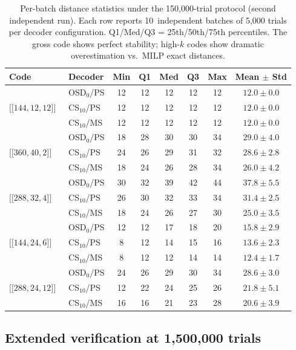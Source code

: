\documentclass[aps,prxquantum,twocolumn,superscriptaddress,nofootinbib]{revtex4-2}
\newcommand{\dblbrk}[1]{\ensuremath{\lbrack\!\lbrack #1 \rbrack\!\rbrack}}
\newcommand{\code}[1]{\dblbrk{#1}}
\begin{document}
\begin{table}[t]
\centering
\caption{Per-batch distance statistics under the 150{,}000-trial protocol (second independent run).
Each row reports 10~independent batches of 5{,}000 trials per decoder configuration.
Q1/Med/Q3 = 25th/50th/75th percentiles.
The gross code shows perfect stability; high-$k$ codes show dramatic overestimation vs.\ MILP exact distances.}
\label{tab:per_batch_stats}
\small
\begin{tabular}{llcccccc}
\toprule
Code & Decoder & Min & Q1 & Med & Q3 & Max & Mean $\pm$ Std \\
\midrule
\multirow{3}{*}{$\code{144,12,12}$~\cite{bravyi2024high}}
  & OSD$_0$/PS    & 12 & 12 & 12 & 12 & 12 & $12.0 \pm 0.0$ \\
  & CS$_{10}$/PS  & 12 & 12 & 12 & 12 & 12 & $12.0 \pm 0.0$ \\
  & CS$_{10}$/MS  & 12 & 12 & 12 & 12 & 12 & $12.0 \pm 0.0$ \\
\midrule
\multirow{3}{*}{$\code{360,40,2}$}
  & OSD$_0$/PS    & 18 & 28 & 30 & 30 & 34 & $29.0 \pm 4.0$ \\
  & CS$_{10}$/PS  & 24 & 26 & 29 & 31 & 32 & $28.6 \pm 2.8$ \\
  & CS$_{10}$/MS  & 18 & 24 & 26 & 28 & 34 & $26.0 \pm 4.2$ \\
\midrule
\multirow{3}{*}{$\code{288,32,4}$}
  & OSD$_0$/PS    & 30 & 32 & 39 & 42 & 44 & $37.8 \pm 5.5$ \\
  & CS$_{10}$/PS  & 26 & 30 & 32 & 33 & 34 & $31.4 \pm 2.5$ \\
  & CS$_{10}$/MS  & 18 & 24 & 26 & 27 & 30 & $25.0 \pm 3.5$ \\
\midrule
\multirow{3}{*}{$\code{144,24,6}$}
  & OSD$_0$/PS    & 12 & 12 & 17 & 18 & 20 & $15.8 \pm 2.9$ \\
  & CS$_{10}$/PS  &  8 & 12 & 14 & 15 & 16 & $13.6 \pm 2.3$ \\
  & CS$_{10}$/MS  &  8 & 12 & 12 & 14 & 14 & $12.4 \pm 1.7$ \\
\midrule
\multirow{3}{*}{$\code{288,24,12}$}
  & OSD$_0$/PS    & 24 & 26 & 29 & 30 & 34 & $28.6 \pm 3.0$ \\
  & CS$_{10}$/PS  & 12 & 22 & 24 & 25 & 26 & $21.8 \pm 5.1$ \\
  & CS$_{10}$/MS  & 16 & 16 & 21 & 23 & 28 & $20.6 \pm 3.9$ \\
\bottomrule
\end{tabular}
\end{table}

\subsection{Extended verification at 1{,}500{,}000 trials}
\end{document}
